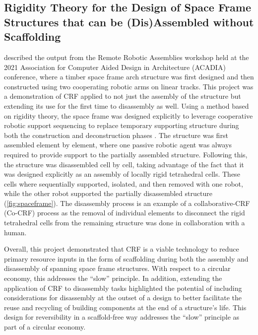 \subsection{Rigidity Theory for the Design of Space Frame Structures that can be (Dis)Assembled without Scaffolding}\label{sec:04_examples_frame}
     described the output from the Remote Robotic Assemblies workshop held at the 2021 Association for Computer Aided Design in Architecture (ACADIA) conference, where a timber space frame arch structure was first designed and then constructed using two cooperating robotic arms on linear tracks. This project was a demonstration of CRF applied to not just the assembly of the structure but extending its use for the first time to disassembly as well. Using a method based on rigidity theory, the space frame was designed explicitly to leverage cooperative robotic support sequencing to replace temporary supporting structure during both the construction and deconstruction phases \citep{bruun_structural_2022}. The structure was first assembled element by element, where one passive robotic agent was always required to provide support to the partially assembled structure. Following this, the structure was disassembled cell by cell, taking advantage of the fact that it was designed explicitly as an assembly of locally rigid tetrahedral cells. These cells where sequentially supported, isolated, and then removed with one robot, while the other robot supported the partially disassembled structure (\cref{fig:spaceframe}). The disassembly process is an example of a collaborative-CRF (Co-CRF) process as the removal of individual elements to disconnect the rigid tetrahedral cells from the remaining structure was done in collaboration with a human.

    Overall, this project demonstrated that CRF is a viable technology to reduce primary resource inputs in the form of scaffolding during both the assembly and disassembly of spanning space frame structures. With respect to a circular economy, this addresses the ``slow'' principle. In addition, extending the application of CRF to disassembly tasks highlighted the potential of including considerations for disassembly at the outset of a design to better facilitate the reuse and recycling of building components at the end of a structure's life. This design for reversibility in a scaffold-free way addresses the ``slow'' principle as part of a circular economy.

